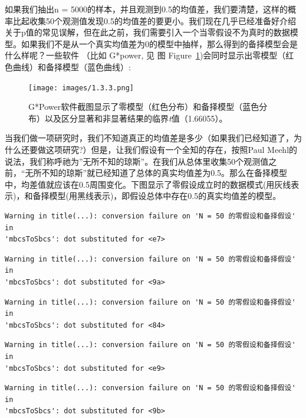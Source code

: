 \documentclass[
  letterpaper,
  DIV=11,
  numbers=noendperiod]{scrreprt}
\begin{document}
如果我们抽出n =
5000的样本，并且观测到0.5的均值差，我们要清楚，这样的概率比起收集50个观测值发现0.5的均值差的要更小。我们现在几乎已经准备好介绍关于p值的常见误解，但在此之前，我们需要引入一个当零假设不为真时的数据模型。如果我们不是从一个真实均值差为0的模型中抽样，那么得到的备择模型会是什么样呢？一些软件
（比如 G*power, 见 图
Figure~\ref{fig-gpowerscreenshot})会同时显示出零模型（红色曲线）和备择模型（蓝色曲线）:

\begin{figure}

{\centering \texttt{[image: images/1.3.3.png]}

}

\caption{\label{fig-gpowerscreenshot}G*Power软件截图显示了零模型（红色分布）和备择模型（蓝色分布）以及区分显著和非显著结果的临界\emph{t}值（1.66055）。}

\end{figure}

当我们做一项研究时，我们不知道真正的均值差是多少（如果我们已经知道了，为什么还要做这项研究?）但是，让我们假设有一个全知的存在，按照Paul
Meehl的说法，我们称呼祂为''无所不知的琼斯''。在我们从总体里收集50个观测值之前，``无所不知的琼斯''就已经知道了总体的真实均值差为0.5。那么在备择模型中，均差值就应该在0.5周围变化。下图显示了零假设成立时的数据模式(用灰线表示)，和备择模型(用黑线表示)，即假设总体中存在0.5的真实均值差的模型。

\begin{verbatim}
Warning in title(...): conversion failure on 'N = 50 的零假设和备择假设' in
'mbcsToSbcs': dot substituted for <e7>
\end{verbatim}

\begin{verbatim}
Warning in title(...): conversion failure on 'N = 50 的零假设和备择假设' in
'mbcsToSbcs': dot substituted for <9a>
\end{verbatim}

\begin{verbatim}
Warning in title(...): conversion failure on 'N = 50 的零假设和备择假设' in
'mbcsToSbcs': dot substituted for <84>
\end{verbatim}

\begin{verbatim}
Warning in title(...): conversion failure on 'N = 50 的零假设和备择假设' in
'mbcsToSbcs': dot substituted for <e9>
\end{verbatim}

\begin{verbatim}
Warning in title(...): conversion failure on 'N = 50 的零假设和备择假设' in
'mbcsToSbcs': dot substituted for <9b>
\end{verbatim}
\end{document}
